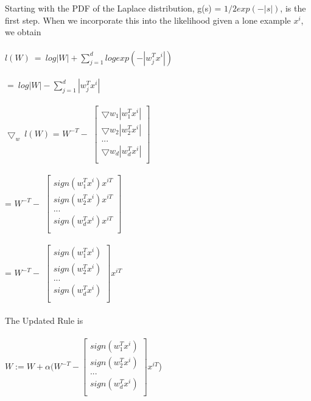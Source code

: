 \newcommand\tab[1][1cm]{\hspace*{#1}}
\begin{answer}
\\ \\
Starting with the PDF of the Laplace distribution, g(s) = $1/2 exp(-|s|)$, is the first step. When we incorporate this into the likelihood given a lone example $x^i$, we obtain \\ \\
$l(W) \ = \ log|W| + \sum_{j=1}^d logexp(-| w_j^Tx^i |)$ \\ \\
\tab$= \ log|W| - \sum_{j=1}^d| w_j^Tx^i |$ \\ \\
$\bigtriangledown_w \ l(W) $ = $W^{-T}  -$ 
$\begin{bmatrix}
\bigtriangledown w_1 |w_1^Tx^i| \\
\bigtriangledown w_2 |w_2^Tx^i| \\
... \\ 
\bigtriangledown w_d |w_d^Tx^i| \\
\end{bmatrix}$ \\ \\

\tab = $W^{-T} - $ 
$\begin{bmatrix}
sign( w_1^Tx^i)x^{iT} \\
sign( w_2^Tx^i)x^{iT} \\
... \\ 
sign( w_d^Tx^i)x^{iT} \\
\end{bmatrix}$ \\ \\

\tab = $W^{-T}  -$ 
$\begin{bmatrix}
sign( w_1^Tx^i) \\
sign( w_2^Tx^i)\\
... \\ 
sign( w_d^Tx^i) \\
\end{bmatrix}x^{iT} $ \\ \\

The Updated Rule is \\ \\

\tab $W:= W+\alpha( W^{-T} -  
\begin{bmatrix}
sign( w_1^Tx^i) \\
sign( w_2^Tx^i)\\
... \\ 
sign( w_d^Tx^i) \\
\end{bmatrix}x^{iT} $)

\end{answer}
